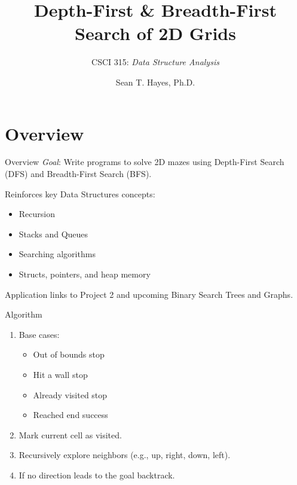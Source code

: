 \documentclass[14pt,aspectratio=1610]{beamer}
\title{\Huge{} Depth-First \& Breadth-First\\Search of 2D Grids}
\subtitle{CSCI 315: \textit{Data Structure Analysis}}
\author{Sean T. Hayes, Ph.D.}
\institute{Charleston Southern University}
\begin{document}
\begin{frame}
  \titlepage{}
\end{frame}

\section*{Overview}

\begin{frame}{Overview}
    \emph{Goal}: Write programs to solve 2D mazes using Depth-First Search (DFS) and Breadth-First Search (BFS).

    Reinforces key Data Structures concepts:

    \begin{itemize}
      \item  Recursion
      \item  Stacks and Queues
      \item  Searching algorithms
      \item  Structs, pointers, and heap memory
    \end{itemize}

    Application links to Project 2 and upcoming Binary Search Trees and Graphs.
\end{frame}

\begin{frame}{Algorithm}

\begin{enumerate}

\item Base cases:
\begin{itemize}
  \item Out of bounds \textrightarrow{} stop
  \item Hit a wall \textrightarrow{} stop
  \item Already visited \textrightarrow{} stop
  \item Reached end \textrightarrow{} success 
\end{itemize}

\item Mark current cell as visited. 
\item Recursively explore neighbors (e.g., up, right, down, left). 
\item If no direction leads to the goal \textrightarrow{} backtrack.
\end{enumerate}
\end{frame}
\end{document}
